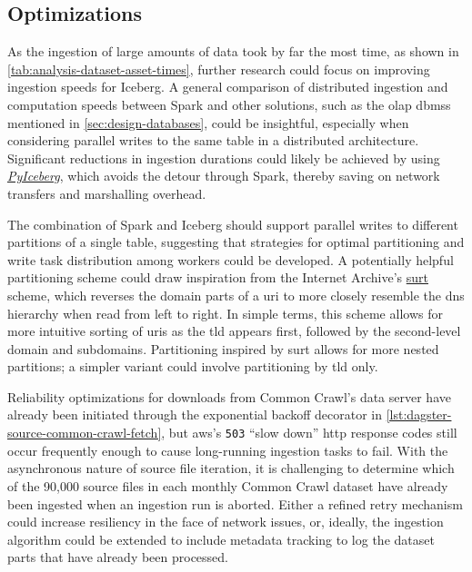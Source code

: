 \subsection{Optimizations}
\label{sec:future-work-optimizations}

As the ingestion of large amounts of data took by far the most time, as shown in \cref{tab:analysis-dataset-asset-times}, further research could focus on improving ingestion speeds for Iceberg.
A general comparison of distributed ingestion and computation speeds between Spark and other solutions, such as the \ac{olap} \acp{dbms} mentioned in \cref{sec:design-databases}, could be insightful, especially when considering parallel writes to the same table in a distributed architecture.
Significant reductions in ingestion durations could likely be achieved by using \href{https://py.iceberg.apache.org/}{\textit{PyIceberg}}, which avoids the detour through Spark, thereby saving on network transfers and marshalling overhead.

The combination of Spark and Iceberg should support parallel writes to different partitions of a single table, suggesting that strategies for optimal partitioning and write task distribution among workers could be developed.
A potentially helpful partitioning scheme could draw inspiration from the Internet Archive's \href{http://crawler.archive.org/articles/user_manual/glossary.html#surt}{\ac{surt}} scheme, which reverses the domain parts of a \ac{uri} to more closely resemble the \ac{dns} hierarchy when read from left to right.
In simple terms, this scheme allows for more intuitive sorting of \acp{uri} as the \ac{tld} appears first, followed by the second-level domain and subdomains.
Partitioning inspired by \ac{surt} allows for more nested partitions; a simpler variant could involve partitioning by \ac{tld} only.

Reliability optimizations for downloads from Common Crawl's data server have already been initiated through the exponential backoff decorator in \cref{lst:dagster-source-common-crawl-fetch}, but \ac{aws}'s \texttt{503} ``slow down'' \ac{http} response codes still occur frequently enough to cause long-running ingestion tasks to fail.
With the asynchronous nature of source file iteration, it is challenging to determine which of the 90,000 source files in each monthly Common Crawl dataset have already been ingested when an ingestion run is aborted.
Either a refined retry mechanism could increase resiliency in the face of network issues, or, ideally, the ingestion algorithm could be extended to include metadata tracking to log the dataset parts that have already been processed.

